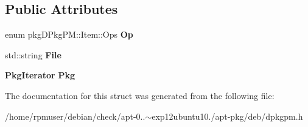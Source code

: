 \subsection*{\-Public \-Attributes}
\begin{DoxyCompactItemize}
\item 
enum pkg\-D\-Pkg\-P\-M\-::\-Item\-::\-Ops {\bfseries \-Op}\label{structpkgDPkgPM_1_1Item_a5b19644b7d14c48b81a8ee447b641290}

\item 
std\-::string {\bfseries \-File}\label{structpkgDPkgPM_1_1Item_ab132f933cf66d57c099dc6226d631deb}

\item 
{\bf \-Pkg\-Iterator} {\bfseries \-Pkg}\label{structpkgDPkgPM_1_1Item_a227c4ee58ef433014fd52236a9448792}

\end{DoxyCompactItemize}


\-The documentation for this struct was generated from the following file\-:\begin{DoxyCompactItemize}
\item 
/home/rpmuser/debian/check/apt-\/0..$\sim$exp12ubuntu10./apt-\/pkg/deb/dpkgpm.\-h\end{DoxyCompactItemize}
